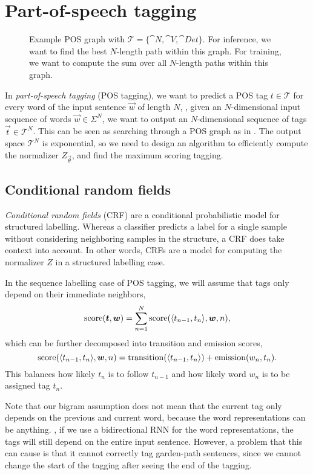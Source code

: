 \section{Part-of-speech tagging} \label{sec:pos-tagging}

\begin{figure}[ht]
    \centering
    \caption{Example POS graph with $\mathcal{T} = \{ \cat{N}, \cat{V},
    \cat{Det} \}$. For inference, we want to find the best $N$-length path
    within this graph. For training, we want to compute the sum over all
    $N$-length paths within this graph.}
    \label{fig:pos-graph}
\end{figure}

In \textit{part-of-speech tagging} (POS tagging), we want to predict a POS tag
$t\in\mathcal{T}$ for every word of the input sentence $\vec{w}$ of length $N$,
\ie, given an $N$-dimensional input sequence of words $\vec{w} \in \Sigma^N$,
we want to output an $N$-dimensional sequence of tags $\vec{t} \in
\mathcal{T}^N$. This can be seen as searching through a POS graph as in
. The output space $\mathcal{T}^N$ is exponential, so we
need to design an algorithm to efficiently compute the normalizer
$Z_{\vec{\theta}}$, and find the maximum scoring tagging.

\subsection{Conditional random fields}

\textit{Conditional random fields} (CRF) are a conditional probabilistic model
for structured labelling. Whereas a classifier predicts a label for a single
sample without considering neighboring samples in the structure, a CRF does
take context into account. In other words, CRFs are a model for computing the
normalizer $Z$ in a structured labelling case.

In the sequence labelling case of POS tagging, we will assume that tags only
depend on their immediate neighbors, \[
  \mathrm{score}(\bm{t},\bm{w}) = \sum_{n=1}^N \mathrm{score}(\langle t_{n-1},t_n \rangle, \bm{w}, n)
,\]
which can be further decomposed into transition and emission scores, \[
  \mathrm{score}(\langle t_{n-1},t_n \rangle, \bm{w}, n) = \mathrm{transition}(\langle t_{n-1},t_n \rangle) + \mathrm{emission}(w_n, t_n)
.\]
This balances how likely $t_n$ is to follow $t_{n-1}$ and how likely word $w_n$
is to be assigned tag $t_n$.

Note that our bigram assumption does not mean that the current tag only depends
on the previous and current word, because the word representations can be
anything. \Eg, if we use a bidirectional RNN for the word representations, the
tags will still depend on the entire input sentence. However, a problem that
this can cause is that it cannot correctly tag garden-path sentences, since we
cannot change the start of the tagging after seeing the end of the
tagging.

